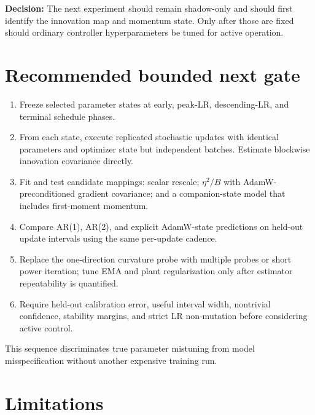 \documentclass[10pt,letterpaper]{article}
\newcommand{\decision}{\textbf{Decision:} }
\begin{document}
\decision The next experiment should remain shadow-only and should first
identify the innovation map and momentum state.  Only after those are fixed
should ordinary controller hyperparameters be tuned for active operation.

\section{Recommended bounded next gate}

\begin{enumerate}
\item Freeze selected parameter states at early, peak-LR, descending-LR, and
terminal schedule phases.
\item From each state, execute replicated stochastic updates with identical
parameters and optimizer state but independent batches.  Estimate blockwise
innovation covariance directly.
\item Fit and test candidate mappings: scalar rescale; $\eta^2/B$ with
AdamW-preconditioned gradient covariance; and a companion-state model that
includes first-moment momentum.
\item Compare AR(1), AR(2), and explicit AdamW-state predictions on held-out
update intervals using the same per-update cadence.
\item Replace the one-direction curvature probe with multiple probes or short
power iteration; tune EMA and plant regularization only after estimator
repeatability is quantified.
\item Require held-out calibration error, useful interval width, nontrivial
confidence, stability margins, and strict LR non-mutation before considering
active control.
\end{enumerate}

This sequence discriminates true parameter mistuning from model misspecification
without another expensive training run.

\section{Limitations}
\end{document}
